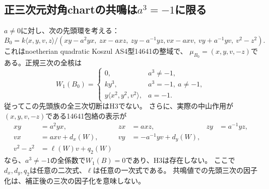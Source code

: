 \subsection{正三次元対角chartの共鳴は$a^3=-1$に限る}
\label{subsec:h3-positive3-diagonal-top}
\begin{theorem}\label{thm:h3-positive3-diagonal-top}
$a\ne0$に対し、次の先頭環を考える：
\[
 B_0=k\langle x,y,v,z\rangle/
 (xy-a^2yx,\ zx-axz,\ zy-a^{-1}yz,
 vx-axv,\ vy+a^{-1}yv,\ v^2-z^2).
\]
これはnoetherian quadratic Koszul AS4型14641の整域で、
$\mu_{B_0}=(x,y,v,-z)$である。正規三次の全核は
\[
 W_1(B_0)=
 \begin{cases}
 0,&a^3\ne-1,\\
 ky^3,&a^3=-1,\ a\ne-1,\\
 y\langle x^2,y^2,v^2\rangle,&a=-1.
 \end{cases}
\]
従ってこの先頭族の全三次切断はH3でない。
さらに、実際の中山作用が$(x,y,v,-z)$である14641包絡の表示が
\begin{align*}
 xy&=a^2yx,&zx&=axz,&zy&=a^{-1}yz,\\
 vx&=axv+d_x(W),&vy&=-a^{-1}yv+d_y(W),\\
 v^2-z^2&=\ell(W)v+q_2(W)
\end{align*}
なら、$a^3\ne-1$の全係数で$W_1(B)=0$であり、H3は存在しない。
ここで$d_x,d_y,q_2$は任意の二次式、$\ell$は任意の一次式である。
共鳴値での先頭三次の因子化は、補正後の三次の因子化を意味しない。
\end{theorem}
